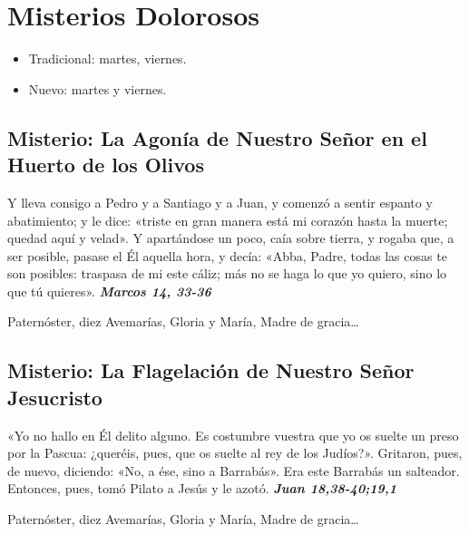 \documentclass[./rosary.tex]{subfiles}
\newcounter{sorrowful-counter}
\begin{document}
\section*{Misterios Dolorosos}
\begin{itemize}
      \item Tradicional: martes, viernes.
      \item Nuevo: martes y viernes.
\end{itemize}

\subsection*{ Misterio: La Agonía de Nuestro Señor en el Huerto de los Olivos}

Y lleva consigo a Pedro y a Santiago y a Juan, y comenzó a sentir espanto y abatimiento; y le dice:
«triste en gran manera está mi corazón hasta la muerte; quedad aquí y velad». Y apartándose un poco,
caía sobre tierra, y rogaba que, a ser posible, pasase el Él aquella hora, y decía: «Abba, Padre, todas las cosas te son posibles:
traspasa de mi este cáliz; más no se haga lo que yo quiero, sino lo que tú quieres». 
\textbf{\emph{Marcos 14, 33-36}}

\begin{center}
      Paternóster, diez Avemarías, Gloria y María, Madre de gracia{\ldots}
\end{center}

\bigskip

\subsection*{ Misterio: La Flagelación de Nuestro Señor Jesucristo}

«Yo no hallo en Él delito alguno. Es costumbre vuestra que yo os suelte un preso por la Pascua:
¿queréis, pues, que os suelte al rey de los Judíos?». Gritaron, pues, de nuevo, diciendo: «No, a ése, sino a Barrabás».
Era este Barrabás un salteador. Entonces, pues, tomó Pilato a Jesús y le azotó. 
\textbf{\emph{Juan 18,38-40;19,1}}

\begin{center}
      Paternóster, diez Avemarías, Gloria y María, Madre de gracia{\ldots}
\end{center}

\bigskip

\end{document}
